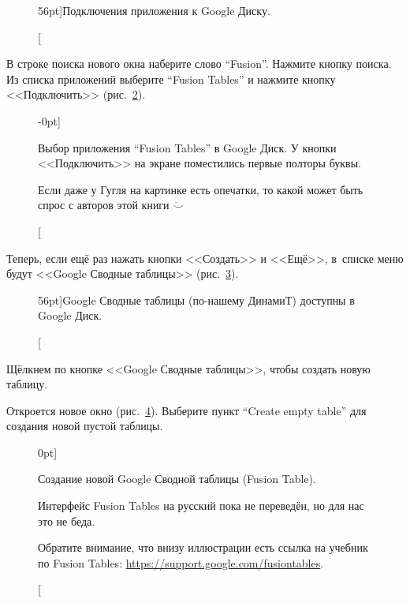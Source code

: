 \begin{figure}
{%
\setlength{\fboxsep}{0pt}%
\setlength{\fboxrule}{1pt}%
%
}%
    \caption[Подключения приложения к Google Диску.][56pt]{Подключения 
            приложения к Google Диску.
    }
  \label{fig:google_drive_connect_more_apps}
\end{figure}

В строке поиска нового окна наберите слово ``Fusion''. Нажмите кнопку поиска. 
Из списка приложений выберите ``Fusion Tables'' и нажмите кнопку <<Подключить>> 
(рис.~\ref{fig:add_fusion_to_drive}).

\begin{figure}
{%
\setlength{\fboxsep}{0pt}%
\setlength{\fboxrule}{1pt}%
%
}%
    \caption[Выбор приложения в Google Диск.][-0pt]{Выбор приложения 
            ``Fusion Tables'' в Google Диск. У кнопки <<Подключить>> 
            на экране поместились первые полторы буквы.

        { Если даже у Гугля на картинке есть опечатки, то какой может быть 
        спрос с авторов этой книги $\ddot\smile$
        }
    }
  \label{fig:add_fusion_to_drive}
\end{figure}

Теперь, если ещё раз нажать кнопки <<Создать>> и <<Ещё>>, в~списке меню будут 
<<Google Сводные таблицы>> (рис.~\ref{fig:fusion_is_available_at_drive}).

\begin{figure}
{%
\setlength{\fboxsep}{0pt}%
\setlength{\fboxrule}{1pt}%
%
}%
    \caption[Google Сводные таблицы доступны в Google Диск.][56pt]{Google Сводные таблицы 
            (по-нашему ДинамиТ) доступны в Google Диск.
    }
  \label{fig:fusion_is_available_at_drive}
\end{figure}

Щёлкнем по кнопке <<Google Сводные таблицы>>, чтобы создать новую таблицу.

Откроется новое окно (рис.~\ref{fig:fusion_create_empty_table}). Выберите пункт 
``Create empty table'' для создания новой пустой таблицы.

\begin{figure}
{%
\setlength{\fboxsep}{0pt}%
\setlength{\fboxrule}{1pt}%
%
}%
    \caption[Создание новой Google Сводной таблицы.][0pt]{Создание новой 
            Google Сводной таблицы (Fusion Table).

            { 
                Интерфейс Fusion Tables на русский пока не переведён, 
                но для нас это не беда. 
            }

            {
                Обратите внимание, что внизу иллюстрации есть ссылка на учебник 
                по Fusion Tables: \url{https://support.google.com/fusiontables}.
            }
    }
  \label{fig:fusion_create_empty_table}
\end{figure}


